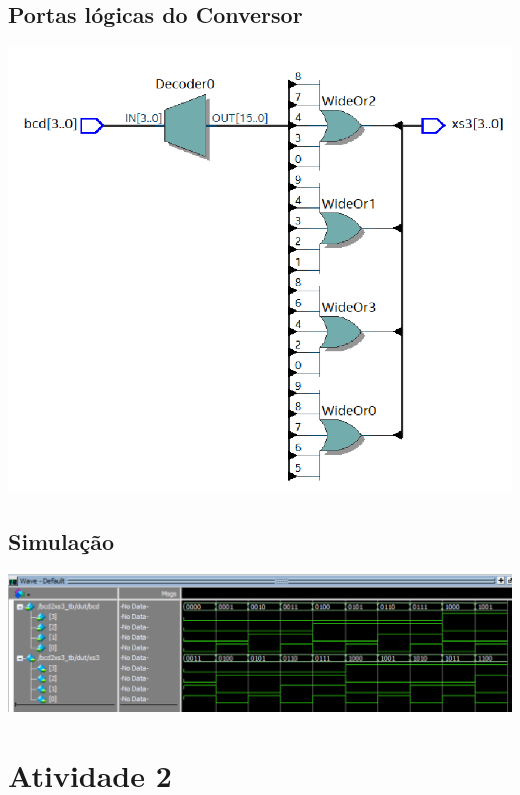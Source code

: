 \documentclass{article}
\begin{document}
\subsection{Portas lógicas do Conversor}
\includegraphics[width=1\textwidth]{bcd2xs3-comportamental-rtl.png}

\subsection{Simulação}
\includegraphics[width=1\textwidth]{bcd2xs3-comportamental-wave.png}

\newpage

\setcounter{section}{2}
\setcounter{subsection}{0}
\section*{Atividade 2}
\end{document}

